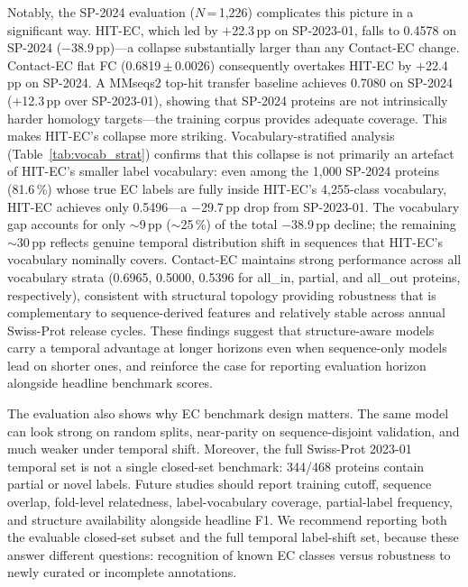 \documentclass[namedate,contemporary,mediumone]{oup-authoring-template}
\begin{document}
Notably, the SP-2024 evaluation ($N$\,=\,1{,}226) complicates this picture in a
significant way. HIT-EC, which led by $+$22.3\,pp on SP-2023-01, falls to 0.4578
on SP-2024 ($-$38.9\,pp)---a collapse substantially larger than any Contact-EC
change. Contact-EC flat FC (0.6819\,$\pm$\,0.0026) consequently overtakes HIT-EC
by $+$22.4\,pp on SP-2024. A MMseqs2 top-hit transfer baseline achieves 0.7080 on SP-2024
($+$12.3\,pp over SP-2023-01), showing that SP-2024 proteins are not
intrinsically harder homology targets---the training corpus provides
adequate coverage. This makes HIT-EC's collapse more striking.
Vocabulary-stratified analysis (Table~\ref{tab:vocab_strat})
confirms that this collapse is not primarily an artefact of HIT-EC's smaller label
vocabulary: even among the 1{,}000 SP-2024 proteins (81.6\,\%) whose true EC labels
are fully inside HIT-EC's 4{,}255-class vocabulary, HIT-EC achieves only
0.5496---a $-$29.7\,pp drop from SP-2023-01. The vocabulary gap accounts
for only $\sim$9\,pp ($\sim$25\,\%) of the total $-$38.9\,pp decline; the
remaining $\sim$30\,pp reflects genuine temporal distribution shift in
sequences that HIT-EC's vocabulary nominally covers. Contact-EC maintains
strong performance across all vocabulary strata (0.6965, 0.5000, 0.5396 for
all\_in, partial, and all\_out proteins, respectively), consistent with structural
topology providing robustness that is complementary to sequence-derived features
and relatively stable across annual Swiss-Prot release cycles. These findings
suggest that structure-aware models carry a temporal advantage at longer horizons
even when sequence-only models lead on shorter ones, and reinforce the case for
reporting evaluation horizon alongside headline benchmark scores.

The evaluation also shows why EC benchmark design matters. The same model can look
strong on random splits, near-parity on sequence-disjoint validation, and much
weaker under temporal shift. Moreover, the full Swiss-Prot 2023-01 temporal set is
not a single closed-set benchmark: 344/468 proteins contain partial or novel labels.
Future studies should report training cutoff, sequence overlap, fold-level
relatedness, label-vocabulary coverage, partial-label frequency, and structure availability alongside headline F1.
We recommend reporting both the evaluable closed-set subset and the full temporal
label-shift set, because these answer different questions: recognition of known EC
classes versus robustness to newly curated or incomplete annotations.
\end{document}
